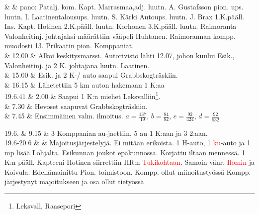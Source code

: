 \documentclass[11pt,a5paper,oneside]{book}
\begin{document}
& & pano: Patalj. kom. Kapt. Marrasmaa,\newline adj. luutn. A. Gustafsson \newline pion. ups. luutn. I. Laatinen\newline talousups. luutn. S. Kärki \newline Autoups. luutn. J. Brax \newline 1.K.pääll. Ins. Kapt. Hotinen \newline 2.K.pääll. luutn. Korhonen \newline 3.K.pääll. luutn. Raimoranta \newline Valonheitinj. johtajaksi määrättiin vääpeli Huhtanen. \newline Raimorannan kompp. muodosti 13. Prikaatin pion. Komppaniat.\\

& 12.00 & Alkoi keskitysmarssi. Autorivistö lähti 12.07, johon kuului Esik., Valonheitinj. ja 2 K. johtajana luutn. Laatinen. \\

& 15.00 & Esik. ja 2 K-/ auto saapui Grabbskogträskiin. \\

& 16.15 & Lähetettiin 5 km auton hakemaan 1 K:aa \\

19.6.41 & 2.00 & Saapui 1 K:n miehet Leksvalliin\footnote{Leksvall, Raasepori}. \\

& 7.30 & Hevoset saapuvat Grabbskogträskiin. \\

& 7.45 & Ensimmäinen valm. ilmoitus. \newline $a=\frac{137}{19}$, $b=\frac{84}{82}$, $e=\frac{92}{424}$, $d=\frac{92}{532}$ \\
\taulustop


19.6. & 9.15 & 3 Komppanian au-jaettiin, 5 au 1 K:aan ja 3 2:aan. \\

19.6-20.6 & & Majoitusjärjestelyjä. Ei mitään erikoista. 1 H-auto, 1 \textcolor{red}{ku}-auto ja 1 mp lisää Lohjalta. Esikunnan joukot epäkunnossa. Korjattu iltaan mennessä. 1 K:n pääll. Kapteeni Hotinen siirrettiin HR:n \textcolor{red}{Tukikohtaan}. Samoin vänr. \textcolor{red}{Ilomin} ja Koivula. Edellämainittu Pion. toimistoon.  Kompp. ollut miinoitustyössä  Kompp. järjestynyt majoitukseen ja osa ollut tietyössä\\ 
\end{document}
